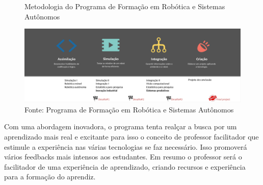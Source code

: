 \begin{figure}[H]
    \caption{Metodologia do Programa de Formação em Robótica e Sistemas Autônomos}
    \centering
    \includegraphics[width= \textwidth]{Figures/metodologia.png}
    \caption*{Fonte: Programa de Formação em Robótica e Sistemas Autônomos}
    \label{fig:metodologia}
\end{figure}

Com uma abordagem inovadora, o programa tenta realçar a busca por um aprendizado mais real e excitante para isso o conceito de professor facilitador que estimule a experiência nas várias tecnologias se faz necessário. Isso promoverá vários feedbacks mais intensos aos estudantes. Em resumo o professor será o facilitador de uma experiência de aprendizado, criando recursos e experiência para a formação do aprendiz.